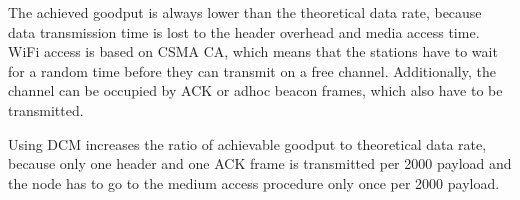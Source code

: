 The achieved goodput is always lower than the theoretical data rate, because data transmission time is lost to the header overhead and media access time.
WiFi access is based on CSMA CA, which means that the stations have to wait for a random time before they can transmit on a free channel.
Additionally, the channel can be occupied by ACK or adhoc beacon frames, which also have to be transmitted.

Using \ac{DCM} increases the ratio of achievable goodput to theoretical data rate, because only one header and one ACK frame is transmitted per
\SI{2000}{\byte} payload and the node has to go to the medium access procedure only once per \SI{2000}{\byte} payload.

